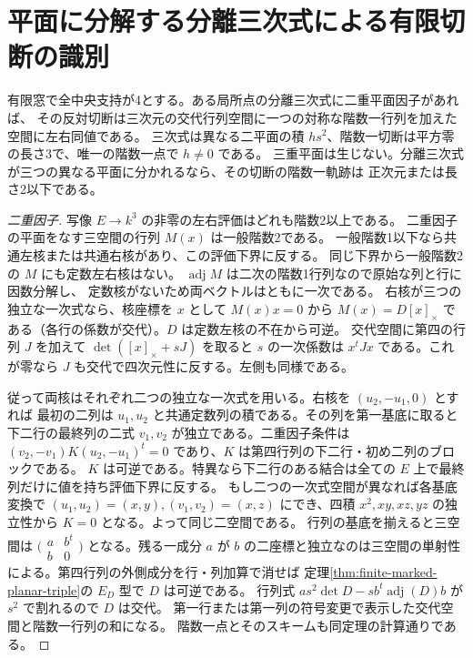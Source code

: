 \section{平面に分解する分離三次式による有限切断の識別}
\label{sec:finite-split-separator-slices}
\begin{theorem}\label{thm:finite-split-separator-slices}
有限窓で全中央支持が4とする。ある局所点の分離三次式に二重平面因子があれば、
その反対切断は三次元の交代行列空間に一つの対称な階数一行列を加えた空間に左右同値である。
三次式は異なる二平面の積 $h s^2$、階数一切断は平方零の長さ3で、唯一の階数一点で $h\ne0$ である。
三重平面は生じない。分離三次式が三つの異なる平面に分かれるなら、その切断の階数一軌跡は
正次元または長さ2以下である。
\end{theorem}
\begin{proof}[二重因子]
写像 $E\to k^3$ の非零の左右評価はどれも階数2以上である。
二重因子の平面をなす三空間の行列 $M(x)$ は一般階数2である。
一般階数1以下なら共通左核または共通右核があり、この評価下界に反する。
同じ下界から一般階数2の $M$ にも定数左右核はない。
$\operatorname{adj}M$ は二次の階数1行列なので原始な列と行に因数分解し、
定数核がないため両ベクトルはともに一次である。
右核が三つの独立な一次式なら、核座標を $x$ として $M(x)x=0$ から
$M(x)=D[x]_\times$ である（各行の係数が交代）。$D$ は定数左核の不在から可逆。
交代空間に第四の行列 $J$ を加えて $\det([x]_\times+sJ)$ を取ると $s$ の一次係数は
$x^t Jx$ である。これが零なら $J$ も交代で四次元性に反する。左側も同様である。

従って両核はそれぞれ二つの独立な一次式を用いる。右核を $(u_2,-u_1,0)$ とすれば
最初の二列は $u_1,u_2$ と共通定数列の積である。その列を第一基底に取ると
下二行の最終列の二式 $v_1,v_2$ が独立である。二重因子条件は
$(v_2,-v_1)K(u_2,-u_1)^t=0$ であり、$K$ は第四行列の下二行・初め二列のブロックである。
$K$ は可逆である。特異なら下二行のある結合は全ての $E$ 上で最終列だけに値を持ち評価下界に反する。
もし二つの一次式空間が異なれば各基底変換で $(u_1,u_2)=(x,y),(v_1,v_2)=(x,z)$
にでき、四積 $x^2,xy,xz,yz$ の独立性から $K=0$ となる。よって同じ二空間である。
行列の基底を揃えると三空間は
$\bigl(\begin{smallmatrix}a&b^t\\ b&0\end{smallmatrix}\bigr)$ となる。残る一成分 $a$ が
$b$ の二座標と独立なのは三空間の単射性による。第四行列の外側成分を行・列加算で消せば
定理\ref{thm:finite-marked-planar-triple}の $E_D$ 型で $D$ は可逆である。
行列式 $a s^2\det D-s b^t\operatorname{adj}(D)b$ が $s^2$ で割れるので $D$ は交代。
第一行または第一列の符号変更で表示した交代空間と階数一行列の和になる。
階数一点とそのスキームも同定理の計算通りである。

\end{proof}
